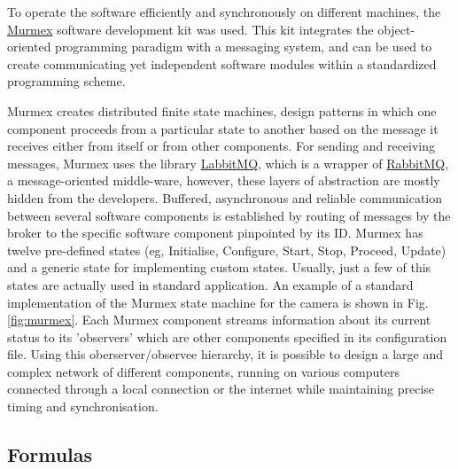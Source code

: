 \documentclass[12pt]{spieman}  %
\begin{document}
\begin{spacing}{2}
To operate the software efficiently and synchronously on different machines, the \href{http://sine.ni.com/nips/cds/view/p/lang/en/nid/212895}{Murmex} software development kit was used. This kit integrates the object-oriented programming paradigm with a messaging system, and can be used to create communicating yet independent software modules within a standardized programming scheme.

Murmex creates distributed finite state machines, design patterns in which one component proceeds from a particular state to another based on the message it receives either from itself or from other components. For sending and receiving messages, Murmex uses the library \href{http://sine.ni.com/nips/cds/view/p/lang/en/nid/211065}{LabbitMQ}, which is a wrapper of \href{http://www.rabbitmq.com/}{RabbitMQ}, a message-oriented middle-ware, however, these layers of abstraction are mostly hidden from the developers. %
Buffered, asynchronous and reliable communication between several software components is established by routing of messages by the broker to the specific software component pinpointed by its ID. %
Murmex has twelve pre-defined states (eg, Initialise, Configure, Start, Stop, Proceed, Update) and a generic state for implementing custom states. Usually, just a few of this states are actually used in standard application. An example of a standard implementation of the Murmex state machine for the camera is shown in Fig. \ref{fig:murmex}. Each Murmex component streams information about its current status to its 'observers' which are other components specified in its configuration file. Using this oberserver/observee hierarchy, it is possible to design a large and complex network of different components, running on various computers connected through a local connection or the internet while maintaining precise timing and synchronisation. %



\subsection{Formulas}


\end{spacing}
\end{document}
